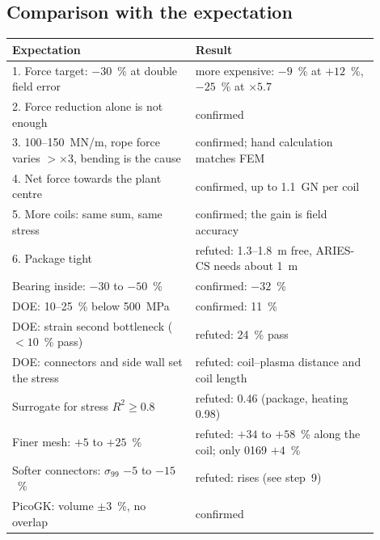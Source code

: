 \subsection*{Comparison with the expectation}
\begin{center}\small
\begin{tabular}{p{0.45\linewidth}p{0.45\linewidth}}
\toprule
Expectation & Result \\
\midrule
1. Force target: $-30$~\% at double field error & more expensive: $-9$~\% at $+12$~\%, $-25$~\% at $\times5.7$ \\
2. Force reduction alone is not enough & confirmed \\
3. 100--150~MN/m, rope force varies $>\times3$, bending is the cause & confirmed; hand calculation matches FEM \\
4. Net force towards the plant centre & confirmed, up to \SI{1.1}{GN} per coil \\
5. More coils: same sum, same stress & confirmed; the gain is field accuracy \\
6. Package tight & refuted: 1.3--\SI{1.8}{m} free, ARIES-CS needs about \SI{1}{m} \\
Bearing inside: $-30$ to $-50$~\% & confirmed: $-32$~\% \\
DOE: 10--25~\% below \SI{500}{MPa} & confirmed: 11~\% \\
DOE: strain second bottleneck ($<10$~\% pass) & refuted: 24~\% pass \\
DOE: connectors and side wall set the stress & refuted: coil--plasma distance and coil length \\
Surrogate for stress $R^2\ge0.8$ & refuted: 0.46 (package, heating 0.98) \\
Finer mesh: $+5$ to $+25$~\% & refuted: $+34$ to $+58$~\% along the coil; only 0169 $+4$~\% \\
Softer connectors: $\sigma_{99}$ $-5$ to $-15$~\% & refuted: rises (see step~9) \\
PicoGK: volume $\pm3$~\%, no overlap & confirmed \\
\bottomrule
\end{tabular}
\end{center}

